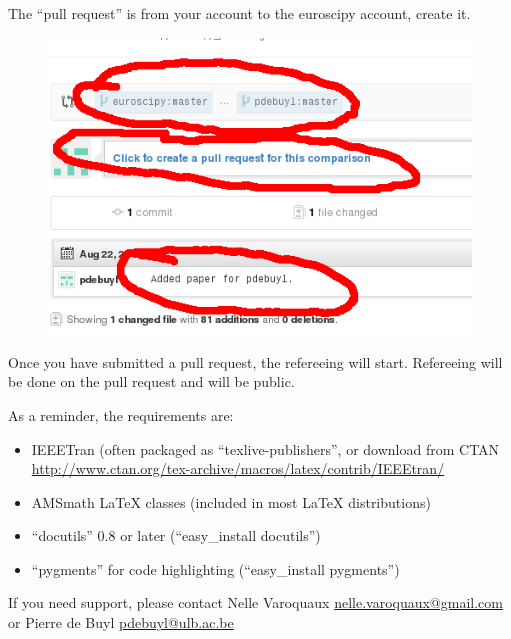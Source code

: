 \documentclass[portrait]{sciposter}
\begin{document}
\begin{multicols}{2}
  The ``pull request'' is from your account to the euroscipy account, create it.

  \begin{figure}[h]
    \centering
    \includegraphics[width=0.6\linewidth]{mypr_create}
  \end{figure}


  Once you have submitted a pull request, the refereeing will start. Refereeing
  will be done on the pull request and will be public.

\end{multicols}

\begin{multicols}{2}
  As a reminder, the requirements are:


  \begin{itemize}
  \item IEEETran (often packaged as ``texlive-publishers'', or download from
   CTAN \url{http://www.ctan.org/tex-archive/macros/latex/contrib/IEEEtran/}
  \item AMSmath LaTeX classes (included in most LaTeX distributions)
  \item ``docutils'' 0.8 or later (``easy\_install docutils'')
  \item ``pygments'' for code highlighting (``easy\_install pygments'')
  \end{itemize}

If you need support, please contact Nelle Varoquaux \url{nelle.varoquaux@gmail.com} or Pierre de Buyl \url{pdebuyl@ulb.ac.be}

\end{multicols}
\end{document}
